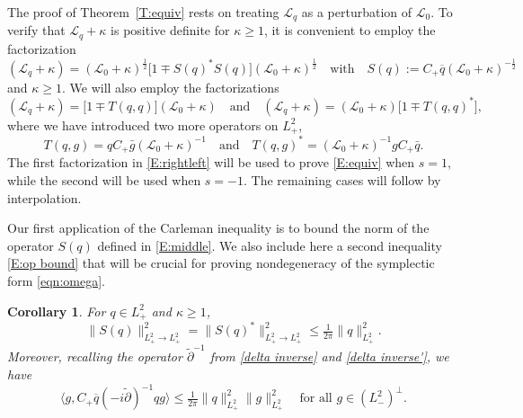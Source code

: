 \documentclass{amsart}
\numberwithin{equation}{section}
\newtheorem{corollary}[theorem]{Corollary}
\theoremstyle{definition}
\newcommand{\ka}{\kappa}
\newcommand{\Lc}{\mathcal{L}}
\newcommand{\dd}{\partial}
\newcommand{\qtq}[1]{\quad\text{#1}\quad}
\begin{document}
The proof of Theorem~\ref{T:equiv} rests on treating $\Lc_q$ as a perturbation of $\Lc_0$. To verify that $\Lc_q+\kappa$ is positive definite for $\kappa\geq 1$, it is convenient to employ the factorization
\begin{equation}\label{E:middle}
(\Lc_q+\ka)=(\Lc_0+\ka)^{\frac12}\bigl[1\mp S(q)^* S(q) \bigr] (\Lc_0+\ka)^{\frac12}
\qtq{with} S(q) := C_+ \overline q (\Lc_0+\ka)^{-\frac12}
\end{equation}
and $\kappa\geq 1$.  We will also employ the factorizations
\begin{equation}\label{E:rightleft}
(\Lc_q+\ka)=\bigl[1\mp T(q,q)\bigr] (\Lc_0+\ka) 
\qtq{and}
(\Lc_q+\ka)=(\Lc_0+\ka) \bigl[1\mp T(q,q)^*\bigr], 
\end{equation} 
where we have introduced two more operators on $L^2_+$,
\begin{equation}\label{E:T&T*}
T(q,g)=qC_+\bar{g}(\Lc_0+\ka)^{-1} \qtq{and} T(q,g)^*=(\Lc_0+\ka)^{-1} gC_+\bar{q}.
\end{equation} 
The first factorization in \eqref{E:rightleft} will be used to prove \eqref{E:equiv} when $s=1$, while the second will be used when $s=-1$.  The remaining cases will follow by interpolation.

Our first application of the Carleman inequality is to bound the norm of the operator $S(q)$ defined in \eqref{E:middle}.  We also include here a second inequality \eqref{E:op bound} that will be crucial for proving nondegeneracy of the symplectic form \eqref{eqn:omega}.

\begin{corollary}
For $q\in L^2_+$ and $\kappa\geq 1$,
\begin{equation}\label{E:S bound}
\| S(q)\|_{L^2_+\to L^2_+}^2 = \| S(q)^* \|_{L^2_+\to L^2_+}^2 \leq \tfrac{1}{2\pi} \|q\|_{L^2_+}^2.
%
\end{equation}
Moreover, recalling the operator $\tilde\partial^{-1}$ from \eqref{delta inverse} and \eqref{delta inverse'}, we have
\begin{equation}\label{E:op bound}
\langle g,C_+ \overline q (-i\tilde{\dd})^{-1} qg\rangle \leq \tfrac{1}{2\pi} \|q\|_{L^2_+}^2 \|g\|_{L^2_+}^2 \quad\text{for all $g\in (L^2_-)^\perp$}.
\end{equation}
\end{corollary}
\end{document}
